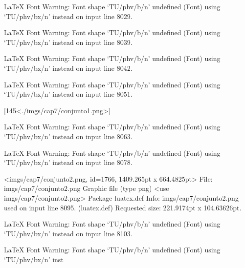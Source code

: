 LaTeX Font Warning: Font shape `TU/phv/b/n' undefined
(Font)              using `TU/phv/bx/n' instead on input line 8029.


LaTeX Font Warning: Font shape `TU/phv/b/n' undefined
(Font)              using `TU/phv/bx/n' instead on input line 8039.


LaTeX Font Warning: Font shape `TU/phv/b/n' undefined
(Font)              using `TU/phv/bx/n' instead on input line 8042.


LaTeX Font Warning: Font shape `TU/phv/b/n' undefined
(Font)              using `TU/phv/bx/n' instead on input line 8051.

[145<./imgs/cap7/conjunto1.png>]

LaTeX Font Warning: Font shape `TU/phv/b/n' undefined
(Font)              using `TU/phv/bx/n' instead on input line 8063.


LaTeX Font Warning: Font shape `TU/phv/b/n' undefined
(Font)              using `TU/phv/bx/n' instead on input line 8078.

<imgs/cap7/conjunto2.png, id=1766, 1409.265pt x 664.4825pt>
File: imgs/cap7/conjunto2.png Graphic file (type png)
<use imgs/cap7/conjunto2.png>
Package luatex.def Info: imgs/cap7/conjunto2.png  used on input line 8095.
(luatex.def)             Requested size: 221.9174pt x 104.63626pt.

LaTeX Font Warning: Font shape `TU/phv/b/n' undefined
(Font)              using `TU/phv/bx/n' instead on input line 8103.


LaTeX Font Warning: Font shape `TU/phv/b/n' undefined
(Font)              using `TU/phv/bx/n' inst